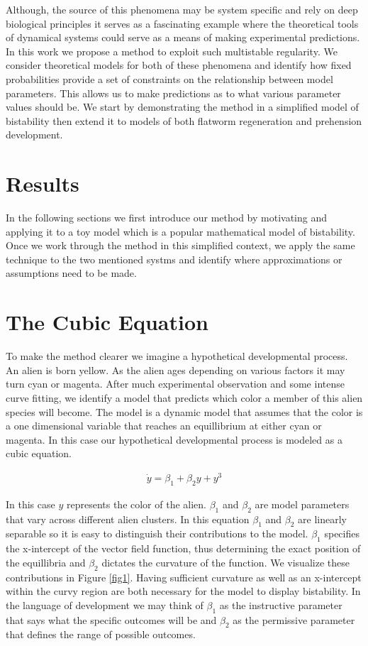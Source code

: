 \documentclass[letterpaper]{article}
\begin{document}
Although, the source of this phenomena may be system specific and rely on deep
biological principles it serves as a fascinating example where the theoretical 
tools of dynamical systems could serve as a means of making experimental predictions.
In this work we propose a method to exploit such multistable regularity. We consider
theoretical models for both of these phenomena and identify how fixed 
probabilities provide a set of constraints on the relationship between model
parameters. This allows us to make predictions as to what various parameter 
values should be. We start by demonstrating the method in a simplified model
of bistability  then extend it to models of both flatworm regeneration and
prehension development.

\section{Results}
In the following sections we first introduce our method by motivating
and applying it to a toy model which is a popular mathematical model
of bistability. Once we work through the method in this simplified 
context, we apply the same technique to the two mentioned systms and 
identify where approximations or assumptions need to be made.

\section{The Cubic Equation}
To make the method clearer we imagine a hypothetical developmental
process. An alien is born yellow. As the alien ages depending
on various factors it may turn cyan or magenta. After much experimental observation
and some intense curve fitting, we identify a model that predicts 
which color a member of this alien species will become. The model is a dynamic
model that assumes that the color is a one dimensional variable that reaches 
an equillibrium at either cyan or magenta. In this case our hypothetical developmental
process is modeled as a cubic equation.

\begin{eqnarray}
    \dot{y} = \beta_1 + \beta_2 y + y^3
\end{eqnarray}

In this case $y$ represents the color of the alien. $\beta_1$ and $\beta_2$ are model 
parameters that vary across different alien clusters. In this equation $\beta_1$ and
$\beta_2$ are linearly separable so it is easy to distinguish their contributions 
to the model. $\beta_1$ specifies the x-intercept of the vector field function,
thus determining the exact position of the equillibria and $\beta_2$ dictates the 
curvature of the function. We visualize these contributions in Figure \ref{fig1}. 
Having sufficient curvature as well as an x-intercept
within the curvy region are both necessary for the model to display bistability.
In the language of development we may think of $\beta_1$ as the instructive parameter 
that says what the
specific outcomes will be and $\beta_2$ as the permissive parameter that defines the
range of possible outcomes.
\end{document}
